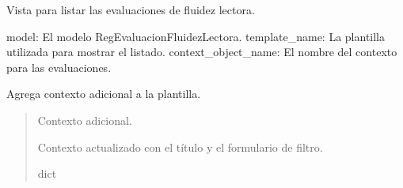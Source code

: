 \documentclass[letterpaper,10pt,spanish]{sphinxmanual}
\begin{document}
\begin{fulllineitems}

\pysigstartsignatures
{}
\pysigstopsignatures
\sphinxAtStartPar
Vista para listar las evaluaciones de fluidez lectora.
\begin{description}
\sphinxAtStartPar
model: El modelo RegEvaluacionFluidezLectora.
template\_name: La plantilla utilizada para mostrar el listado.
context\_object\_name: El nombre del contexto para las evaluaciones.

\end{description}


\begin{fulllineitems}

\pysigstartsignatures
{}
\pysigstopsignatures
\end{fulllineitems}



\begin{fulllineitems}

\pysigstartsignatures
{}
\pysigstopsignatures
\sphinxAtStartPar
Agrega contexto adicional a la plantilla.
\begin{quote}\begin{description}
\sphinxAtStartPar
{} \textendash{} Contexto adicional.

\sphinxAtStartPar
Contexto actualizado con el título y el formulario de filtro.

\sphinxAtStartPar
dict

\end{description}\end{quote}

\end{fulllineitems}



\begin{fulllineitems}


\end{fulllineitems}
\end{fulllineitems}
\end{document}
